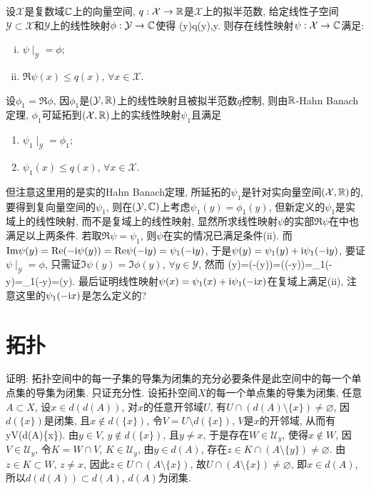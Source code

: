设$\mathcal{X}$是复数域$\Bbb C$上的向量空间, $q: \mathcal{X}\to\Bbb R$是$\mathcal{X}$上的拟半范数, 
给定线性子空间$\mathcal{Y}\subset\mathcal{X}$和$\mathcal{Y}$上的线性映射$\phi: \mathcal{Y}\to\Bbb C$使得
\bee
\Re\phi(y)\le q(y),\quad\forall y\in{}.
\eee
则存在线性映射$\psi:\mathcal{X}\to\Bbb C$满足:
\begin{enumerate}[(i)]
 \item $\psi\mid_{\mathcal{Y}}=\phi$;
 \item $\Re\psi(x)\le q(x)$, $\forall x\in\mathcal{X}$.
\end{enumerate}
\eu
\ba
设$\phi_1=\Re\phi$, 因$\phi_1$是$(\mathcal{Y},\Bbb R)$上的线性映射且被拟半范数$q$控制, 
则由$\Bbb R$-Hahn Banach定理, $\phi_1$可延拓到$(\mathcal{X},\Bbb R)$上的实线性映射$\psi_1$且满足
\begin{enumerate}[(i')]
 \item $\psi_1\mid_{\mathcal{Y}}=\phi_1$;
 \item $\psi_1(x)\le q(x)$, $\forall x\in\mathcal{X}$.
\end{enumerate}
但注意这里用的是实的Hahn Banach定理, 所延拓的$\psi_1$是针对实向量空间$(\mathcal{X},\Bbb R)$的, 要得到复向量空间的$\psi_1$, 
则在$(\mathcal{Y},\Bbb C)$上考虑$\psi_1(y)=\phi_1(y)$, 但新定义的$\psi_1$是实域上的线性映射, 而不是复域上的线性映射, 
显然所求线性映射$\psi$的实部$\Re\psi$在{\color{red}{实线性空间}}中也满足以上两条件. 
若取$\Re \psi=\psi_1$, 则$\psi$在实的情况已满足条件(ii). 而$\mathrm{Im}\psi(y)=\mathrm{Re}(-\mathrm{i}\psi(y))=\mathrm{Re}\psi(-\mathrm{i} y)=\psi_1(-\mathrm{i} y)$, 于是$\psi(y)=\psi_1(y)+\mathrm{i}\psi_1(-\mathrm{i} y)$, 
要证$\psi\mid_{\mathcal{Y}}=\phi$, 只需证$\Im\psi(y)=\Im\phi(y)$, $\forall y\in\mathcal{Y}$, 然而
\bee
\Im\phi(y)=\Re(-\ui\phi(y))=\Re(\phi(-\ui y))=\phi_1(-\ui y)=\psi_1(-\ui y)=\Im\psi(y).
\eee
最后证明线性映射$\psi(x)=\psi_1(x)+\mathrm{i}\psi_1(-\mathrm{i} x)$在复域上满足(ii), 注意这里的$\psi_1(-\mathrm{i} x)$是怎么定义的?
\ea


\section{拓扑}
证明: 拓扑空间中的每一子集的导集为闭集的充分必要条件是此空间中的每一个单点集的导集为闭集.
\et
\ba
只证充分性. 设拓扑空间$X$的每一个单点集的导集为闭集, 任意$A\subset X$, 设$x\in d(d(A))$, 对$x$的任意开邻域$U$,
有$U\cap(d(A)\setminus\{x\})\ne\varnothing$, 因$d(\{x\})$是闭集, 且$x\not\in d(\{x\})$, 令$V=U\setminus d(\{x\})$, 
$V$是$x$的开邻域, 从而有
\bee
y\in V\cap(d(A)\setminus\{x\}).
\eee
由$y\in V$, $y\not\in d(\{x\})$, 且$y\ne x$, 于是存在$W\in\mathscr{U}_y$, 使得$x\not\in W$, 因$V\in\mathscr{U}_y$, 
令$K=W\cap V$, $K\in\mathscr{U}_y$, 由$y\in d(A)$, 存在$z\in K\cap(A\setminus\{y\})\ne\varnothing$.
由$z\in K\subset W$, $z\ne x$, 因此$z\in U\cap(A\setminus\{x\})$, 故$U\cap(A\setminus\{x\})\ne\varnothing$,
即$x\in d(A)$, 所以$d(d(A))\subset d(A)$, $d(A)$为闭集.
\ea

